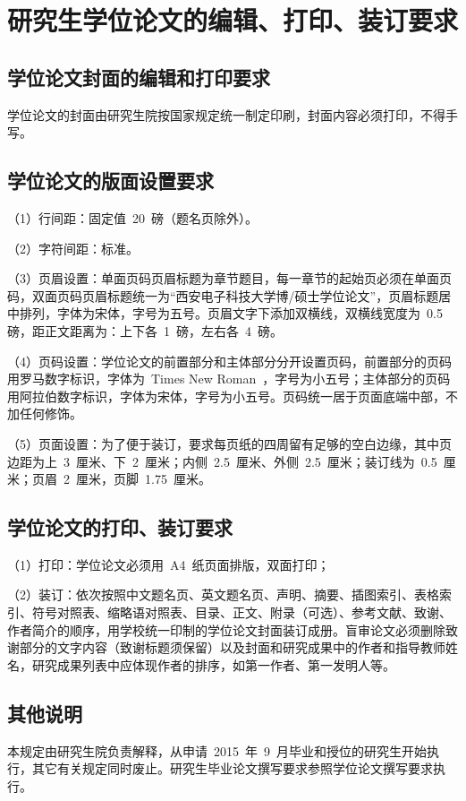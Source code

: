 
\chapter{研究生学位论文的编辑、打印、装订要求}

\section{学位论文封面的编辑和打印要求}

学位论文的封面由研究生院按国家规定统一制定印刷，封面内容必须打印，不得手写。

\section{学位论文的版面设置要求}

（1）行间距：固定值~20~磅（题名页除外）。

（2）字符间距：标准。

（3）页眉设置：单面页码页眉标题为章节题目，每一章节的起始页必须在单面页码，双面页码页眉标题统一为“西安电子科技大学博/硕士学位论文”，页眉标题居中排列，字体为宋体，字号为五号。页眉文字下添加双横线，双横线宽度为~0.5~ 磅，距正文距离为：上下各~1~磅，左右各~4~磅。

（4）页码设置：学位论文的前置部分和主体部分分开设置页码，前置部分的页码用罗马数字标识，字体为~Times New Roman~，字号为小五号；主体部分的页码用阿拉伯数字标识，字体为宋体，字号为小五号。页码统一居于页面底端中部，不加任何修饰。

（5）页面设置：为了便于装订，要求每页纸的四周留有足够的空白边缘，其中页边距为上~3~厘米、下~2~厘米；内侧~2.5~厘米、外侧~2.5~厘米；装订线为~0.5~厘米；页眉~2~厘米，页脚~1.75~厘米。

\section{学位论文的打印、装订要求}

（1）打印：学位论文必须用~A4~纸页面排版，双面打印；

（2）装订：依次按照中文题名页、英文题名页、声明、摘要、插图索引、表格索引、符号对照表、缩略语对照表、目录、正文、附录（可选）、参考文献、致谢、作者简介的顺序，用学校统一印制的学位论文封面装订成册。盲审论文必须删除致谢部分的文字内容（致谢标题须保留）以及封面和研究成果中的作者和指导教师姓名，研究成果列表中应体现作者的排序，如第一作者、第一发明人等。

\section{其他说明}

本规定由研究生院负责解释，从申请~2015~年~9~月毕业和授位的研究生开始执行，其它有关规定同时废止。研究生毕业论文撰写要求参照学位论文撰写要求执行。
